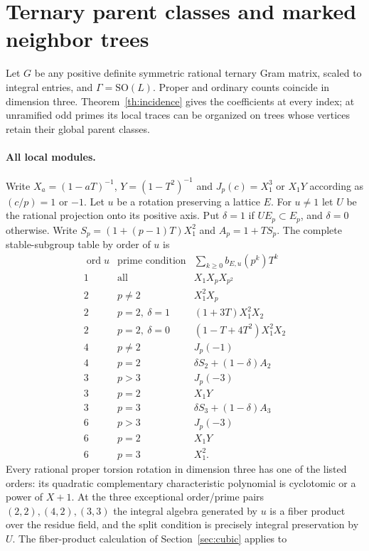\section{Ternary parent classes and marked neighbor trees}\label{sec:ternary-general}
Let $G$ be any positive definite symmetric rational ternary Gram
matrix, scaled to integral entries, and $\Gamma=\mathrm{SO}(L)$.
Proper and ordinary counts coincide in dimension three.
Theorem~\ref{th:incidence} gives the coefficients at every index;
at unramified odd primes its local traces can be organized on trees
whose vertices retain their global parent classes.

\paragraph{All local modules.}
Write $X_a=(1-aT)^{-1}$, $Y=(1-T^2)^{-1}$ and
$J_p(c)=X_1^3$ or $X_1Y$ according as $(c/p)=1$ or $-1$.
Let $u$ be a rotation preserving a lattice $E$. For $u\ne1$ let $U$
be the rational projection onto its positive axis. Put
$\delta=1$ if $U E_p\subset E_p$, and $\delta=0$ otherwise.
Write $S_p=(1+(p-1)T)X_1^2$ and $A_p=1+TS_p$.
The complete stable-subgroup table by order of $u$ is
\[
\begin{array}{c|l|l}
\operatorname{ord}u&\text{prime condition}&\sum_{k\ge0}b_{E,u}(p^k)T^k\\ \hline
1&\text{all}&X_1 X_p X_{p^2}\\
2&p\ne2& X_1^2 X_p\\
2&p=2,\ \delta=1&(1+3T)X_1^2 X_2\\
2&p=2,\ \delta=0&(1-T+4T^2)X_1^2 X_2\\
4&p\ne2& J_p(-1)\\
4&p=2& \delta S_2+(1-\delta)A_2\\
3&p>3& J_p(-3)\\
3&p=2&X_1Y\\
3&p=3&\delta S_3+(1-\delta)A_3\\
6&p>3&J_p(-3)\\
6&p=2&X_1Y\\
6&p=3&X_1^2 .
\end{array}
\]
Every rational proper torsion rotation in dimension three has one of
the listed orders: its quadratic complementary characteristic polynomial
is cyclotomic or a power of $X+1$. At the three exceptional
order/prime pairs $(2,2),(4,2),(3,3)$ the integral algebra generated
by $u$ is a fiber product over the residue field, and the split
condition is precisely integral preservation by $U$. The fiber-product calculation of Section~\ref{sec:cubic} applies to
